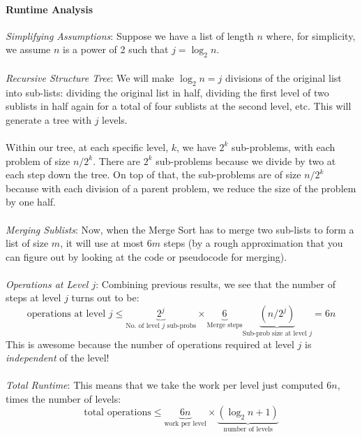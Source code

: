 \documentclass[12pt]{article}
\theoremstyle{plain}
\theoremstyle{definition}
\theoremstyle{remark}
\begin{document}
\paragraph{Runtime Analysis}
{\sl Simplifying Assumptions}:
    Suppose we have a list of length
    $n$ where, for simplicity, we assume $n$ is a
    power of 2 such that $j = \log_2 n$. 
    \\
    \\
{\sl Recursive Structure Tree}:
    We will make $\log_2 n = j$ divisions of 
    the original list into sub-lists: dividing the original
    list in half, dividing the first level of two sublists in
    half again for a total of four sublists at the second
    level, etc. This will generate a tree with $j$ levels.
    \\
    \\
    Within our tree, at each specific level, $k$, we have 
    $2^k$ sub-problems, with each problem of size
    $n/2^k$.  There are $2^k$ sub-problems because
    we divide by two at each step down the tree.
    On top of that, the sub-problems are
    of size $n/2^k$ because with each division of a 
    parent problem, we reduce the size of the problem 
    by one half.
    \\
    \\
{\sl Merging Sublists}:
    Now, when the Merge Sort has to merge two sub-lists 
    to form a list of size $m$, it will use at most
    $6m$ steps (by a rough approximation that you
    can figure out by looking at the code or pseudocode
    for merging).
    \\
    \\
{\sl Operations at Level $j$}:
    Combining previous results, we see that the number of 
    steps at level $j$ turns out to be:
    \[ \text{operations at level $j$} \leq 
	\underbrace{2^j}_{\text{No. of level $j$ sub-probs}} 
	\times \underbrace{6}_{\text{Merge steps}}
	\underbrace{\left(n/2^j\right)}_{\text{Sub-prob size
	at level $j$}} = 6n \]
    This is awesome because the number of operations
    required at level $j$ is \emph{independent} of the level!
    \\
    \\
{\sl Total Runtime}:
    This means that we take the work per level just computed
    $6n$, times the number of levels:
    \[ \text{total operations} \leq \underbrace{6n}_{\text{work per level}}
	\times \underbrace{\left( \log_2 n +1\right)}_{\text{number of levels}}
	\]



\clearpage
\end{document}
